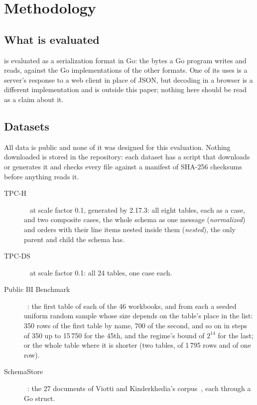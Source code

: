 \section{Methodology}
\label{sec:methodology}

\subsection{What is evaluated}

\colbin{} is evaluated as a serialization format in Go: the bytes a Go
program writes and reads, against the Go implementations of the other
formats. One of its uses is a server's response to a web client in place of
JSON, but decoding in a browser is a different implementation and is outside
this paper; nothing here should be read as a claim about it.

\subsection{Datasets}
\label{sec:datasets}

All data is public and none of it was designed for this evaluation. Nothing
downloaded is stored in the repository: each dataset has a script that
downloads or generates it and checks every file against a manifest of SHA-256
checksums before anything reads it.

\begin{description}
\item[TPC-H]~\cite{tpch} at scale factor 0.1, generated by 
  2.17.3: all eight tables, each as a case, and two composite cases, the
  whole schema as one message (\emph{normalized}) and orders with their line
  items nested inside them (\emph{nested}), the only parent and child the
  schema has.
\item[TPC-DS]~\cite{tpcds} at scale factor 0.1: all 24 tables, one case
  each.
\item[Public BI Benchmark]~\cite{publicbi}: the first table of each of the 46
  workbooks, and from each a seeded uniform random sample whose size depends
  on the table's place in the list: 350 rows of the first table by name, 700
  of the second, and so on in steps of 350 up to 15\,750 for the 45th, and
  the regime's bound of $2^{14}$ for the last; or the whole table where it
  is shorter (two tables, of 1\,795 rows and of one row).
\item[SchemaStore]~\cite{schemastore}: the 27 documents of Viotti and
  Kinderkhedia's corpus~\cite{viotti2022benchmark}, each through a Go struct.
\end{description}

